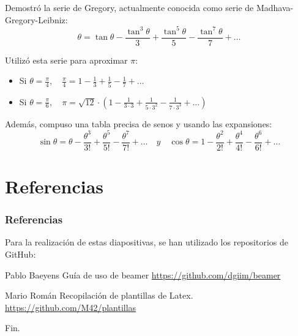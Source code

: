 \documentclass[compress, aspectratio=169]{beamer} %
\begin{document}
		\begin{frame}
			Demostró la serie de Gregory, actualmente conocida como serie de Madhava-Gregory-Leibniz:
			$$\theta = \tan \theta - \frac{\tan^3 \theta}{3} + \frac{\tan^5 \theta}{5} - \frac{\tan^7 \theta}{7} + \dots$$

			Utilizó esta serie para aproximar $\pi$:
			\begin{itemize}
				\item Si $\displaystyle \theta = \frac{\pi}{4}, \quad \frac{\pi}{4} = 1 - \frac{1}{3} + \frac{1}{5}
				- \frac{1}{7} + \dots$
				\item Si $\displaystyle \theta = \frac{\pi}{6}, \quad \pi = \sqrt{12} \cdot \left(1 - \frac{1}{3 \cdot 3}
				+ \frac{1}{5 \cdot 3^2} - \frac{1}{7 \cdot 3^3} + \dots \right)$
			\end{itemize}
			
			Además, compuso una tabla precisa de senos y usando las expansiones:
			$$\sin \theta = \theta - \frac{\theta^3}{3!} + \frac{\theta^5}{5!} - \frac{\theta^7}{7!} + \dots \quad y
			\quad \cos \theta = 1 - \frac{\theta^2}{2!} + \frac{\theta^4}{4!} - \frac{\theta^6}{6!} + \dots $$
		\end{frame}

\section{Referencias}
	\begin{frame}
		\frametitle{Referencias}
		
		Para la realización de estas diapositivas, se han utilizado los repositorios de GitHub:
		
		\footnotesize{
		  \begin{thebibliography}{7} %
		     Pablo Baeyens
		      \newblock Guía de uso de beamer
		      \newblock \url{https://github.com/dgiim/beamer}
		      
		     Mario Román
		      \newblock Recopilación de plantillas de Latex.
		      \newblock \url{https://github.com/M42/plantillas}
		  \end{thebibliography}
		}
	\end{frame}


\begin{frame}
\Huge{\centerline{Fin.}}
\end{frame}

\end{document}
